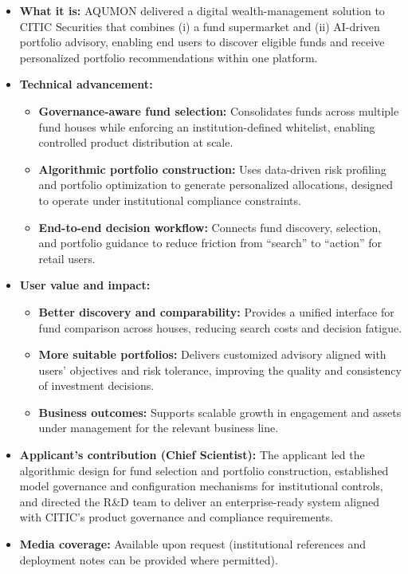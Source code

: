 \documentclass[11pt]{article}
\newenvironment{tightitemize}{%
  \begin{itemize}[leftmargin=*,nosep,topsep=2pt]
}{\end{itemize}}
\begin{document}
\begin{tightitemize}
  \item \textbf{What it is:} AQUMON delivered a digital wealth-management solution to CITIC Securities that combines (i) a fund supermarket and (ii) AI-driven portfolio advisory, enabling end users to discover eligible funds and receive personalized portfolio recommendations within one platform.
  \item \textbf{Technical advancement:}
  \begin{tightitemize}
    \item \textbf{Governance-aware fund selection:} Consolidates funds across multiple fund houses while enforcing an institution-defined whitelist, enabling controlled product distribution at scale.
    \item \textbf{Algorithmic portfolio construction:} Uses data-driven risk profiling and portfolio optimization to generate personalized allocations, designed to operate under institutional compliance constraints.
    \item \textbf{End-to-end decision workflow:} Connects fund discovery, selection, and portfolio guidance to reduce friction from ``search'' to ``action'' for retail users.
  \end{tightitemize}
  \item \textbf{User value and impact:}
  \begin{tightitemize}
    \item \textbf{Better discovery and comparability:} Provides a unified interface for fund comparison across houses, reducing search costs and decision fatigue.
    \item \textbf{More suitable portfolios:} Delivers customized advisory aligned with users’ objectives and risk tolerance, improving the quality and consistency of investment decisions.
    \item \textbf{Business outcomes:} Supports scalable growth in engagement and assets under management for the relevant business line.
  \end{tightitemize}
  \item \textbf{Applicant’s contribution (Chief Scientist):} The applicant led the algorithmic design for fund selection and portfolio construction, established model governance and configuration mechanisms for institutional controls, and directed the R\&D team to deliver an enterprise-ready system aligned with CITIC’s product governance and compliance requirements.
  \item \textbf{Media coverage:} Available upon request (institutional references and deployment notes can be provided where permitted).
\end{tightitemize}
\end{document}
